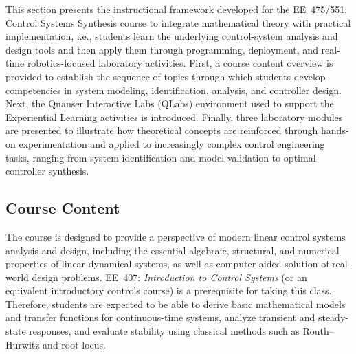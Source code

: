 \documentclass[journal]{IEEEtran}
\begin{document}
This section %
presents the instructional framework developed for the EE~475/551: Control Systems Synthesis course to integrate mathematical theory with practical implementation, i.e., students learn the underlying control-system analysis and design tools and then apply them through programming, deployment, and real-time robotics-focused laboratory activities. %
First, a course content overview is provided to establish the sequence of topics through which students develop competencies in system modeling, identification, analysis, and controller design. Next, the Quanser Interactive Labs (QLabs) environment used to support the Experiential Learning activities is introduced. Finally, three laboratory modules are presented to illustrate how theoretical concepts are reinforced through hands-on experimentation and applied to increasingly complex control engineering tasks, ranging from system identification and model validation to optimal controller synthesis.




\subsection{Course Content}

The course is designed to provide a perspective of modern linear control systems analysis and design, including the essential algebraic, structural, and numerical properties of linear dynamical systems, as well as computer-aided solution of real-world design problems. 
EE~407: \textit{Introduction to Control Systems} (or an equivalent introductory controls course) is a prerequisite for taking this class. Therefore, students are expected to be able to derive basic mathematical models and transfer functions for continuous-time systems, analyze transient and steady-state responses, and evaluate stability using classical methods such as Routh--Hurwitz and root locus.%
\end{document}
